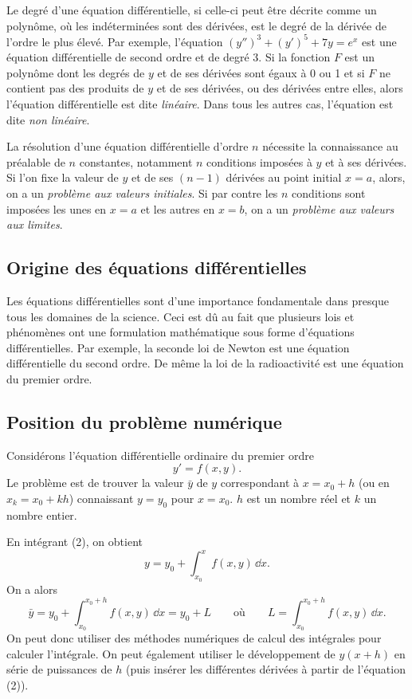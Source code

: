 Le degré d'une équation différentielle, si celle-ci peut être décrite comme un
polynôme, où les indéterminées sont des dérivées, est le degré de la dérivée de
l'ordre le plus élevé. Par exemple, l'équation
$(y'')^3 + (y')^5 + 7y = e^x$ est une équation différentielle de second ordre
et de degré 3. Si la fonction $F$ est un polynôme dont les degrés de $y$ et de
ses dérivées sont égaux à 0 ou 1 et si $F$ ne contient pas des produits de $y$
et de ses dérivées, ou des dérivées entre elles, alors l'équation
différentielle est dite \emph{linéaire}. Dans tous les autres cas, l'équation
est dite \emph{non linéaire}.

La résolution d'une équation différentielle d'ordre $n$ nécessite la
connaissance au préalable de $n$ constantes, notamment $n$ conditions imposées
à $y$ et à ses dérivées. Si l'on fixe la valeur de $y$ et de ses $(n-1)$
dérivées au point initial $x = a$, alors, on a un \emph{problème aux valeurs
initiales}. Si par contre les $n$ conditions sont imposées les unes en $x = a$
et les autres en $x = b$, on a un \emph{problème aux valeurs aux limites}.

\subsection{Origine des équations différentielles}

Les équations différentielles sont d'une importance fondamentale dans presque
tous les domaines de la science. Ceci est dû au fait que plusieurs lois et
phénomènes ont une formulation mathématique sous forme d'équations
différentielles. Par exemple, la seconde loi de Newton est une équation
différentielle du second ordre. De même la loi de la radioactivité est une
équation du premier ordre.

\subsection{Position du problème numérique}

Considérons l'équation différentielle ordinaire du premier ordre
\begin{equation}
  y' = f(x, y) .
  \tag{2}
\end{equation}
Le problème est de trouver la valeur $\bar{y}$ de $y$ correspondant à
$x = x_0 + h$ (ou en $x_k = x_0 + kh$) connaissant $y = y_0$ pour $x = x_0$.
$h$ est un nombre réel et $k$ un nombre entier.

En intégrant (2), on obtient
\begin{equation}
  y = y_0 + \int_{x_0}^{x} f(x, y)\,\dd x .
  \tag{3}
\end{equation}
On a alors
\begin{equation}
  \bar{y} = y_0 + \int_{x_0}^{x_0+h} f(x, y)\,\dd x = y_0 + L
  \qquad\text{où}\qquad
  L = \int_{x_0}^{x_0+h} f(x, y)\,\dd x .
  \tag{4}
\end{equation}
On peut donc utiliser des méthodes numériques de calcul des intégrales pour
calculer l'intégrale. On peut également utiliser le développement de
$y(x+h)$ en série de puissances de $h$ (puis insérer les différentes dérivées
à partir de l'équation (2)).


